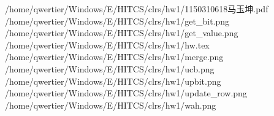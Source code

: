 /home/qwertier/Windows/E/HITCS/clrs/hw1/1150310618马玉坤.pdf
/home/qwertier/Windows/E/HITCS/clrs/hw1/get_bit.png
/home/qwertier/Windows/E/HITCS/clrs/hw1/get_value.png
/home/qwertier/Windows/E/HITCS/clrs/hw1/hw.tex
/home/qwertier/Windows/E/HITCS/clrs/hw1/merge.png
/home/qwertier/Windows/E/HITCS/clrs/hw1/ucb.png
/home/qwertier/Windows/E/HITCS/clrs/hw1/upbit.png
/home/qwertier/Windows/E/HITCS/clrs/hw1/update_row.png
/home/qwertier/Windows/E/HITCS/clrs/hw1/wah.png
